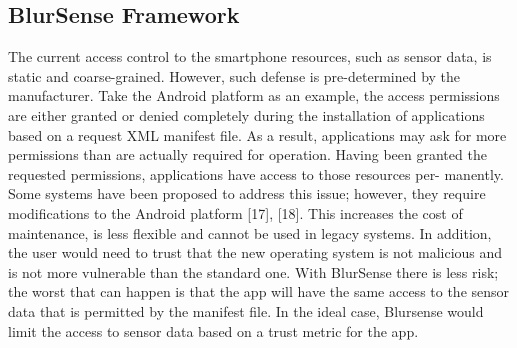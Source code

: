 \subsection{BlurSense Framework}
The current access control to the smartphone resources,
such as sensor data, is static and coarse-grained. However,
such defense is pre-determined by the manufacturer. Take the
Android platform as an example, the access permissions are
either granted or denied completely during the installation of
applications based on a request XML manifest file. As a result,
applications may ask for more permissions than are actually
required for operation. Having been granted the requested
permissions, applications have access to those resources per-
manently. Some systems have been proposed to address this
issue; however, they require modifications to the Android
platform [17], [18]. This increases the cost of maintenance, is
less flexible and cannot be used in legacy systems. In addition,
the user would need to trust that the new operating system is
not malicious and is not more vulnerable than the standard one.
With BlurSense there is less risk; the worst that can happen is
that the app will have the same access to the sensor data that
is permitted by the manifest file. In the ideal case, Blursense
would limit the access to sensor data based on a trust metric for the app.

